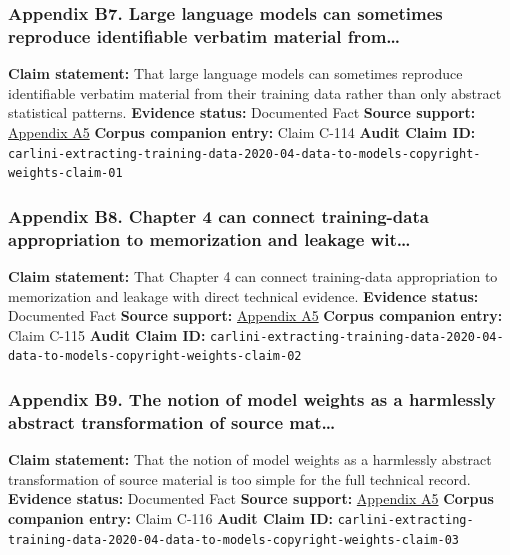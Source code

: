 \documentclass[
  american,
  11pt,
  letterpaper,
]{article}
\begin{document}
\subsubsection{Appendix B7. Large language models can sometimes
reproduce identifiable verbatim material
from\ldots{}}\label{appendix-b7-large-language-models-can-sometimes-reproduce-identifiable-verbatim-material-from}

\textbf{Claim statement:} That large language models can sometimes
reproduce identifiable verbatim material from their training data rather
than only abstract statistical patterns. \textbf{Evidence status:}
Documented Fact \textbf{Source support:}
\hyperref[appendix-a5-extracting-training-data-from-large-language-models]{Appendix
A5} \textbf{Corpus companion entry:} Claim C-114 \textbf{Audit Claim
ID:}
\texttt{carlini-extracting-training-data-2020-04-data-to-models-copyright-weights-claim-01}

\subsubsection{Appendix B8. Chapter 4 can connect training-data
appropriation to memorization and leakage
wit\ldots{}}\label{appendix-b8-chapter-4-can-connect-training-data-appropriation-to-memorization-and-leakage-wit}

\textbf{Claim statement:} That Chapter 4 can connect training-data
appropriation to memorization and leakage with direct technical
evidence. \textbf{Evidence status:} Documented Fact \textbf{Source
support:}
\hyperref[appendix-a5-extracting-training-data-from-large-language-models]{Appendix
A5} \textbf{Corpus companion entry:} Claim C-115 \textbf{Audit Claim
ID:}
\texttt{carlini-extracting-training-data-2020-04-data-to-models-copyright-weights-claim-02}

\subsubsection{Appendix B9. The notion of model weights as a harmlessly
abstract transformation of source
mat\ldots{}}\label{appendix-b9-the-notion-of-model-weights-as-a-harmlessly-abstract-transformation-of-source-mat}

\textbf{Claim statement:} That the notion of model weights as a
harmlessly abstract transformation of source material is too simple for
the full technical record. \textbf{Evidence status:} Documented Fact
\textbf{Source support:}
\hyperref[appendix-a5-extracting-training-data-from-large-language-models]{Appendix
A5} \textbf{Corpus companion entry:} Claim C-116 \textbf{Audit Claim
ID:}
\texttt{carlini-extracting-training-data-2020-04-data-to-models-copyright-weights-claim-03}
\end{document}
